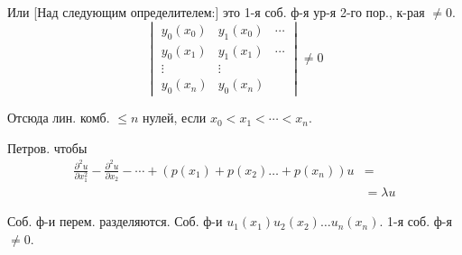 \par\noindent\begin{minipage}{\linewidth}
Или
[Над следующим определителем:] это 1-я соб. ф-я ур-я 2-го пор., к-рая $\neq0$.
\begin{equation*}
\begin{vmatrix}
y_0(x_0)&y_1(x_0)&\cdots\\
y_0(x_1)&y_1(x_1)&\cdots\\
\vdots&\vdots&\\
y_0(x_n)&y_0(x_n)&
\end{vmatrix}\neq0
\end{equation*}
\end{minipage}\par
Отсюда лин. комб. $\leq n$ нулей, если $x_0<x_1<\cdots<x_n$.
\par\noindent\begin{minipage}{\linewidth}
Петров. чтобы
\begin{equation*}
\begin{aligned}
\frac{\partial^2u}{\partial x_1^2}
-\frac{\partial^2u}{\partial x_2}-\cdots
+\left(p(x_1)+p(x_2)\ldots+p(x_n)\right)u&={}\\
&=\lambda u
\end{aligned}
\end{equation*}
\end{minipage}\par
Соб. ф-и перем. разделяются.
Соб. ф-и $u_1(x_1)u_2(x_2)\ldots u_n(x_n)$.
1-я соб. ф-я $\neq0$.


